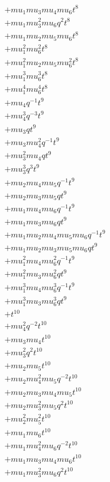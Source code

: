 \begin{align*}
  + mu_1 mu_3 mu_4 mu_6 t^{8} \\
  + mu_1 mu_3^{2} mu_6 q^{2} t^{8} \\
  + mu_1 mu_2 mu_5 mu_6 t^{8} \\
  + mu_1^{2} mu_6^{2} t^{8} \\
  + mu_1^{2} mu_2 mu_5 mu_6^{2} t^{8} \\
  + mu_1^{3} mu_6^{3} t^{8} \\
  + mu_1^{4} mu_6^{4} t^{8} \\
  + mu_4 q^{-1} t^{9} \\
  + mu_4^{3} q^{-3} t^{9} \\
  + mu_3 q t^{9} \\
  + mu_3 mu_4^{2} q^{-1} t^{9} \\
  + mu_3^{2} mu_4 q t^{9} \\
  + mu_3^{3} q^{3} t^{9} \\
  + mu_2 mu_4 mu_5 q^{-1} t^{9} \\
  + mu_2 mu_3 mu_5 q t^{9} \\
  + mu_1 mu_4 mu_6 q^{-1} t^{9} \\
  + mu_1 mu_3 mu_6 q t^{9} \\
  + mu_1 mu_2 mu_4 mu_5 mu_6 q^{-1} t^{9} \\
  + mu_1 mu_2 mu_3 mu_5 mu_6 q t^{9} \\
  + mu_1^{2} mu_4 mu_6^{2} q^{-1} t^{9} \\
  + mu_1^{2} mu_3 mu_6^{2} q t^{9} \\
  + mu_1^{3} mu_4 mu_6^{3} q^{-1} t^{9} \\
  + mu_1^{3} mu_3 mu_6^{3} q t^{9} \\
  + t^{10} \\
  + mu_4^{2} q^{-2} t^{10} \\
  + mu_3 mu_4 t^{10} \\
  + mu_3^{2} q^{2} t^{10} \\
  + mu_2 mu_5 t^{10} \\
  + mu_2 mu_4^{2} mu_5 q^{-2} t^{10} \\
  + mu_2 mu_3 mu_4 mu_5 t^{10} \\
  + mu_2 mu_3^{2} mu_5 q^{2} t^{10} \\
  + mu_2^{2} mu_5^{2} t^{10} \\
  + mu_1 mu_6 t^{10} \\
  + mu_1 mu_4^{2} mu_6 q^{-2} t^{10} \\
  + mu_1 mu_3 mu_4 mu_6 t^{10} \\
  + mu_1 mu_3^{2} mu_6 q^{2} t^{10} \\

\end{align*}
